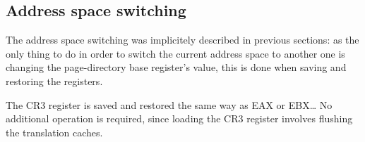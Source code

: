 %
%

\subsection{Address space switching}

The address space switching was implicitely described in previous
sections: as the only thing to do in order to switch the current
address space to another one is changing the page-directory base
register's value, this is done when saving and restoring the
registers.

The CR3 register is saved and restored the same way as EAX or
EBX\ldots{} No additional operation is required, since loading the CR3
register involves flushing the translation caches.
